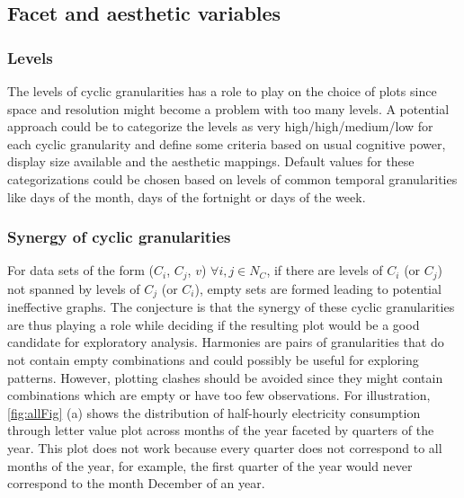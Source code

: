 \documentclass[12pt]{article}
\begin{document}
\hypertarget{facet-and-aesthetic-variables}{%
\subsection{Facet and aesthetic variables}\label{facet-and-aesthetic-variables}}

\hypertarget{sec:levels}{%
\subsubsection{Levels}\label{sec:levels}}

The levels of cyclic granularities has a role to play on the choice of plots since space and resolution might become a problem with too many levels. A potential approach could be to categorize the levels as very high/high/medium/low for each cyclic granularity and define some criteria based on usual cognitive power, display size available and the aesthetic mappings. Default values for these categorizations could be chosen based on levels of common temporal granularities like days of the month, days of the fortnight or days of the week.

\hypertarget{sec:vis-interaction}{%
\subsubsection{Synergy of cyclic granularities}\label{sec:vis-interaction}}

For data sets of the form (\(C_i\), \(C_j\), \(v\)) \(\forall i, j \in N_C\), if there are levels of \(C_i\) (or \(C_j\)) not spanned by levels of \(C_j\) (or \(C_i\)), empty sets are formed leading to potential ineffective graphs. The conjecture is that the synergy of these cyclic granularities are thus playing a role while deciding if the resulting plot would be a good candidate for exploratory analysis. Harmonies are pairs of granularities that do not contain empty combinations and could possibly be useful for exploring patterns. However, plotting clashes should be avoided since they might contain combinations which are empty or have too few observations. For illustration, \autoref{fig:allFig} (a) shows the distribution of half-hourly electricity consumption through letter value plot across months of the year faceted by quarters of the year. This plot does not work because every quarter does not correspond to all months of the year, for example, the first quarter of the year would never correspond to the month December of an year.
\end{document}
